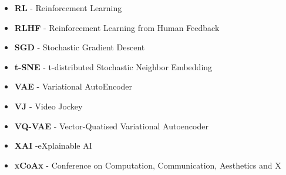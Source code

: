 \begin{itemize}
\item \textbf{RL} - Reinforcement Learning
\item \textbf{RLHF} - Reinforcement Learning from Human Feedback
\item \textbf{SGD} - Stochastic Gradient Descent
\item \textbf{t-SNE} - t-distributed Stochastic Neighbor Embedding
\item \textbf{VAE} - Variational AutoEncoder
\item \textbf{VJ} - Video Jockey
\item \textbf{VQ-VAE} - Vector-Quatised Variational Autoencoder
\item \textbf{XAI} -eXplainable AI
\item \textbf{xCoAx} - Conference on Computation, Communication, Aesthetics and X
\end{itemize}